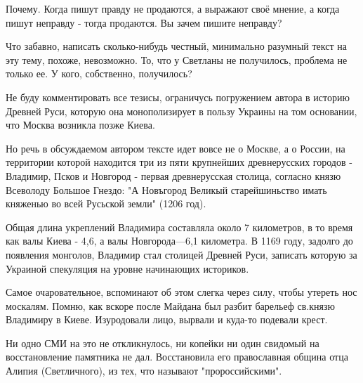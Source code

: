 \begin{itemize}
\begin{itemize}
Почему. Когда пишут правду не продаются, а выражают своё мнение, а когда пишут
неправду - тогда продаются. Вы зачем пишите неправду?
\end{itemize}

 

Что забавно, написать сколько-нибудь честный, минимально разумный текст на эту
тему, похоже, невозможно. То, что у Светланы не получилось, проблема не только
ее. У кого, собственно, получилось? 

Не буду комментировать все тезисы, ограничусь погружением автора в историю
Древней Руси, которую она монополизирует в пользу Украины на том основании, что
Москва возникла позже Киева. 

Но речь в обсуждаемом автором тексте идет вовсе не о Москве, а о России, на
территории которой находится три из пяти крупнейших древнерусских городов -
Владимир, Псков и Новгород - первая древнерусская столица, согласно князю
Всеволоду Большое Гнездо: "А Новъгород Великый старейшиньство имать княженью во
всей Русьской земли" (1206 год). 

Общая длина укреплений Владимира составляла около 7 километров, в то время как
валы Киева - 4,6, а валы Новгорода—6,1 километра. В 1169 году, задолго до
появления монголов, Владимир стал столицей Древней Руси, записать которую за
Украиной спекуляция на уровне начинающих историков. 

Самое очаровательное, вспоминают об этом слегка через силу, чтобы утереть нос
москалям. Помню, как вскоре после Майдана был разбит барельеф св.князю
Владимиру в Киеве. Изуродовали лицо, вырвали и куда-то подевали крест.

Ни одно СМИ на это не откликнулось, ни копейки ни один свидомый на
восстановление памятника не дал. Восстановила его православная община отца
Алипия (Светличного), из тех, что называют "пророссийскими".


\begin{itemize}
 

\end{itemize}
\end{itemize}
